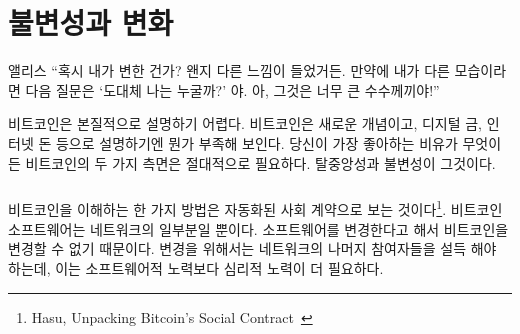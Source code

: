 \chapter{불변성과 변화}
\label{les:1}

\begin{chapquote}{앨리스}
	\enquote{혹시 내가 변한 건가?
		왠지 다른 느낌이 들었거든. 만약에 내가 다른 모습이라면 다음 질문은 `도대체 나는 누굴까?' 야.
		아, 그것은 너무 큰 수수께끼야!}
\end{chapquote}



비트코인은 본질적으로 설명하기 어렵다. 
비트코인은 새로운 개념이고, 디지털 금, 인터넷 돈 등으로 설명하기엔 뭔가 부족해 보인다. 
당신이 가장 좋아하는 비유가 무엇이든 비트코인의 두 가지 측면은 절대적으로 필요하다. 
탈중앙성과 불변성이 그것이다.

\paragraph{}
비트코인을 이해하는 한 가지 방법은 자동화된 사회 계약으로 보는 것이다\footnote{Hasu, Unpacking Bitcoin's Social Contract~\cite{social-contract}}. 
비트코인 소프트웨어는 네트워크의 일부분일 뿐이다. 
소프트웨어를 변경한다고 해서 비트코인을 변경할 수 없기 때문이다. 
변경을 위해서는 네트워크의 나머지 참여자들을 설득 해야 하는데, 
이는 소프트웨어적 노력보다 심리적 노력이 더 필요하다.


